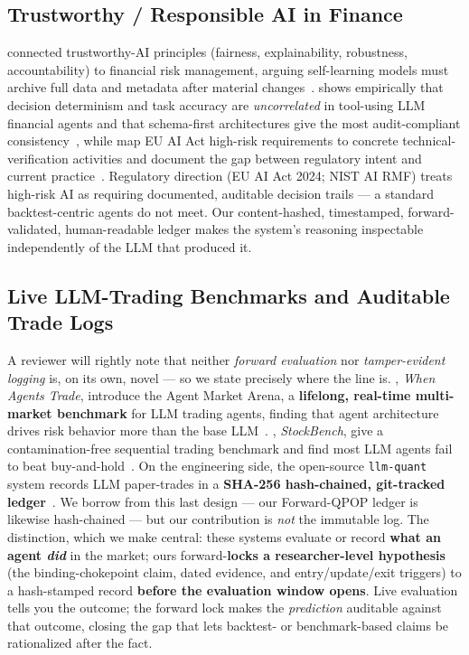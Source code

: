 \documentclass[11pt]{article}
\begin{document}
\subsection{Trustworthy / Responsible AI in Finance}

\citet{fritzmorgenthal2022xai} connected trustworthy-AI principles (fairness,
explainability, robustness, accountability) to financial risk management,
arguing self-learning models must archive full data and metadata after material
changes~\citep{fritzmorgenthal2022xai}. \citet{khatchadourian2026replayable}
shows empirically that decision determinism and task accuracy are
\emph{uncorrelated} in tool-using LLM financial agents and that schema-first
architectures give the most audit-compliant
consistency~\citep{khatchadourian2026replayable}, while
\citet{buscemi2026euaiact} map EU AI Act high-risk requirements to concrete
technical-verification activities and document the gap between regulatory intent
and current practice~\citep{buscemi2026euaiact}. Regulatory direction (EU AI
Act 2024; NIST AI RMF) treats high-risk AI as requiring documented, auditable
decision trails --- a standard backtest-centric agents do not meet. Our
content-hashed, timestamped, forward-validated, human-readable ledger makes the
system's reasoning inspectable independently of the LLM that produced it.

\subsection{Live LLM-Trading Benchmarks and Auditable Trade Logs}

A reviewer will rightly note that neither \emph{forward evaluation} nor
\emph{tamper-evident logging} is, on its own, novel --- so we state precisely
where the line is. \citet{qian2025whenagents}, \emph{When Agents Trade},
introduce the Agent Market Arena, a \textbf{lifelong, real-time multi-market
benchmark} for LLM trading agents, finding that agent architecture drives risk
behavior more than the base LLM~\citep{qian2025whenagents}.
\citet{chen2025stockbench}, \emph{StockBench}, give a contamination-free
sequential trading benchmark and find most LLM agents fail to beat
buy-and-hold~\citep{chen2025stockbench}. On the engineering side, the
open-source \texttt{llm-quant} system records LLM paper-trades in a
\textbf{SHA-256 hash-chained, git-tracked ledger}~\citep{45ck2025llmquant}. We
borrow from this last design --- our Forward-QPOP ledger is likewise
hash-chained --- but our contribution is \emph{not} the immutable log. The
distinction, which we make central: these systems evaluate or record
\textbf{what an agent \emph{did}} in the market; ours
forward-\textbf{locks a researcher-level hypothesis} (the binding-chokepoint
claim, dated evidence, and entry/update/exit triggers) to a hash-stamped record
\textbf{before the evaluation window opens}. Live evaluation tells you the
outcome; the forward lock makes the \emph{prediction} auditable against that
outcome, closing the gap that lets backtest- or benchmark-based claims be
rationalized after the fact.
\end{document}
